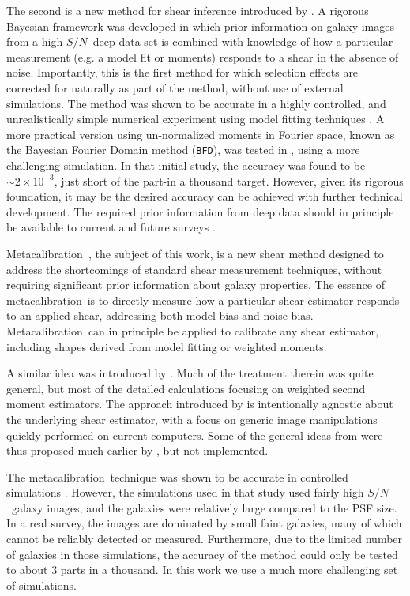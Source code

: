 \documentclass[a4paper,fleqn,usenatbib]{mnras}
\newcommand{\snr}{$S/N$}
\newcommand{\mcal}{metacalibration}
\newcommand{\Mcal}{Metacalibration}
\newcommand{\bfd}{\texttt{BFD}}
\begin{document}
The second is a new method for shear inference introduced by
\citep{ba14,bfd2016}.  A rigorous Bayesian framework was developed in which
prior information on galaxy images from a high \snr\ deep data set is combined
with knowledge of how a particular measurement (e.g. a model fit or moments)
responds to a shear in the absence of noise.  Importantly, this is the first
method for which selection effects are corrected for naturally as part of the
method, without use of external simulations.  The method was shown to be
accurate in a highly controlled, and unrealistically simple numerical
experiment using model fitting techniques \citep{Sheldon2014}.  A more
practical version using un-normalized moments in Fourier space, known as the
Bayesian Fourier Domain method (\bfd), was tested in \cite{bfd2016}, using a
more challenging simulation.  In that initial study, the accuracy was found to
be $\sim 2 \times 10^{-3}$, just short of the part-in a thousand target.
However, given its rigorous foundation, it may be the desired accuracy can be
achieved with further technical development.  The required prior information
from deep data should in principle be available to current and future surveys
\citep{DESWhitePaper,TakadaHSC2010,IvezicLSST08,Euclid2011,SpergelWFIRST2015}.

\Mcal\ \citep{HuffMcal}, the subject of this work, is a new shear
method designed to address the shortcomings of standard shear measurement
techniques, without requiring significant prior information about galaxy
properties.  The essence of \mcal\ is to directly measure how a particular
shear estimator responds to an applied shear, addressing both model bias and
noise bias.  \Mcal\ can in principle be applied to calibrate any shear
estimator, including shapes derived from model fitting or weighted moments.

A similar idea was introduced by \cite{Kaiser2000}.  Much of the treatment
therein was quite general, but most of the detailed calculations focusing on
weighted second moment estimators.  The approach introduced by \citep{HuffMcal}
is intentionally agnostic about the underlying shear estimator, with a focus on
generic image manipulations quickly performed on current computers.  Some
of the general ideas from \citep{HuffMcal} were thus proposed much earlier by
\cite{Kaiser2000}, but not implemented.

The \mcal\ technique was shown to be accurate in controlled simulations
\citep{HuffMcal}.  However, the simulations used in that study \citep[based on
those used in][]{great3} used fairly high \snr\ galaxy images, and the galaxies
were relatively large compared to the PSF size.  In a real survey, the images
are dominated by small faint galaxies, many of which cannot be reliably
detected or measured.  Furthermore, due to the limited number of galaxies in
those simulations, the accuracy of the method could only be tested to about 3
parts in a thousand.  In this work we use a much more challenging set of
simulations.
\end{document}

